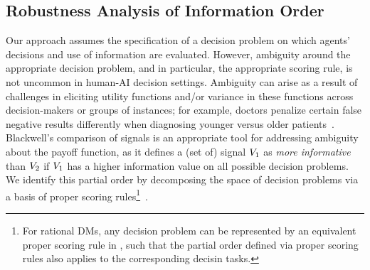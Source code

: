 
 \mvspace{-2mm}

\subsection{Robustness Analysis of Information Order}
 \mvspace{-2mm}
Our approach assumes the specification of a decision problem on which agents' decisions and use of information are evaluated. However, 
ambiguity around the appropriate decision problem, and in particular, the appropriate scoring rule, is not uncommon in human-AI decision settings. Ambiguity can arise as a result of challenges in eliciting utility functions and/or variance in these functions across decision-makers or groups of instances; for example, doctors penalize certain false negative results differently when diagnosing younger versus older patients~\citep{mclaughlin2022algorithmic}.
Blackwell's comparison of signals \citep{blackwell1951comparison} is an appropriate tool for addressing ambiguity about the payoff function, as it defines a (set of) signal $V_1$ as \textit{more informative} than $V_2$ if $V_1$ has a higher information value on all possible decision problems. 
We identify this partial order by decomposing the space of decision problems via a basis of proper scoring rules\footnote{For rational DMs, any decision problem can be represented by an equivalent proper scoring rule in , such that the partial order defined via proper scoring rules also applies to the corresponding decisin tasks.}~\citep{li2022optimization, kleinberg2023u}.

